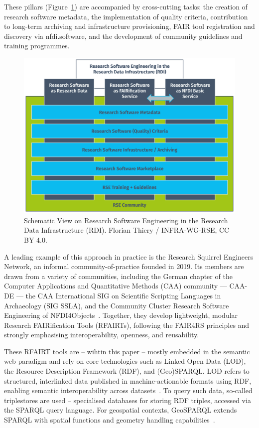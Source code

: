 \documentclass{eceasst}
\begin{document}
These pillars (Figure~\ref{fig:001}) are accompanied by cross-cutting tasks: the creation of research software metadata, the implementation of quality criteria, contribution to long-term archiving and infrastructure provisioning, FAIR tool registration and discovery via nfdi.software, and the development of community guidelines and training programmes.

\begin{figure}[h!]
\centering
\includegraphics[width=0.95\linewidth]{ECEASST-LaTeX-Templates/img/Fig_03.png}
\caption{Schematic View on Research Software Engineering in the Research Data Infrastructure (RDI). Florian Thiery / INFRA-WG-RSE, CC BY 4.0.}\label{fig:001}
\end{figure}

A leading example of this approach in practice is the Research Squirrel Engineers Network, an informal community-of-practice founded in 2019. Its members are drawn from a variety of communities, including the German chapter of the Computer Applications and Quantitative Methods (CAA) community — CAA-DE — the CAA International SIG on Scientific Scripting Languages in Archaeology (SIG SSLA), and the Community Cluster Research Software Engineering of NFDI4Objects~\cite{thiery_digitale_2025,von_rummel_nfdi4objects_2025}. Together, they develop lightweight, modular Research FAIRification Tools (RFAIRTs), following the FAIR4RS principles and strongly emphasising interoperability, openness, and reusability.

These RFAIRT tools are – wihtin this paper – mostly embedded in the semantic web paradigm and rely on core technologies such as Linked Open Data (LOD), the Resource Description Framework (RDF), and (Geo)SPARQL. LOD refers to structured, interlinked data published in machine-actionable formats using RDF, enabling semantic interoperability across datasets~\cite{schmidt_practices_2022}. To query such data, so-called triplestores are used – specialised databases for storing RDF triples, accessed via the SPARQL query language. For geospatial contexts, GeoSPARQL extends SPARQL with spatial functions and geometry handling capabilities~\cite{car_geosparql_2022}.
\end{document}
